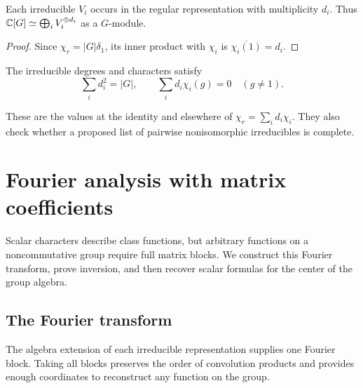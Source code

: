 \begin{prop}
\label{prop-decomposition-rep-regular}
Each irreducible $V_i$ occurs in the regular representation with multiplicity
$d_i$. Thus $\mathbb{C}[G]\simeq\bigoplus_i V_i^{\oplus d_i}$ as a $G$-module.
\end{prop}
\begin{proof}
Since $\chi_r=|G|\delta_1$, its inner product with $\chi_i$ is
$\overline{\chi_i(1)}=d_i$.
\end{proof}


\begin{cor}
\label{cor-enombrement}
The irreducible degrees and characters satisfy
\[
 \sum_i d_i^2=|G|,\qquad
 \sum_i d_i\chi_i(g)=0\quad(g\ne1).
\]
\end{cor}
These are the values at the identity and elsewhere of
$\chi_r=\sum_i d_i\chi_i$. They also check whether a proposed list of
pairwise nonisomorphic irreducibles is complete.

\section{Fourier analysis with matrix coefficients}

Scalar characters describe class functions, but arbitrary functions on a
noncommutative group require full matrix blocks. We construct this Fourier
transform, prove inversion, and then recover scalar formulas for the center
of the group algebra.

\subsection{The Fourier transform}

The algebra extension of each irreducible representation supplies one
Fourier block. Taking all blocks preserves the order of convolution products
and provides enough coordinates to reconstruct any function on the group.


